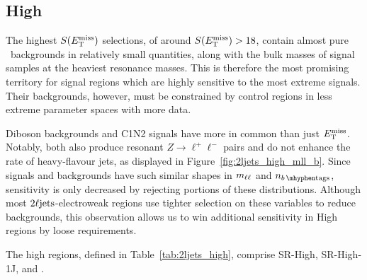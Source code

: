 \FloatBarrier
\subsection{High}
\label{sec:2ljets_high}
The highest $S(E_\mathrm{T}^\mathrm{miss})$ selections, of around $S(E_\mathrm{T}^\mathrm{miss}) > 18$, contain almost pure
\diboson\ backgrounds in relatively small quantities, along with the bulk masses
of signal samples at the heaviest resonance masses.
This is therefore the most promising territory for signal regions which are
highly sensitive to the most extreme signals.
Their backgrounds, however, must be constrained by control regions in less
extreme parameter spaces with more data.

Diboson backgrounds and C1N2 signals have more in common than just $E_\mathrm{T}^\mathrm{miss}$.
Notably, both also produce resonant $Z\rightarrow \ell^+\ell^-$ pairs
and do not enhance the rate of heavy-flavour jets, as displayed in
Figure~\ref{fig:2ljets_high_mll_b}.
Since signals and backgrounds have such similar shapes in $m_{\ell\ell}$ and $\nbtag$,
sensitivity is only decreased by rejecting portions of these distributions.
Although most $2\ell\mathrm{jets}$-electroweak regions use tighter selection on these
variables to reduce backgrounds, this observation allows us to win
additional sensitivity in High regions by loose requirements.

The high regions, defined in Table~\ref{tab:2ljets_high}, comprise SR-High,
SR-High-1J, and \srllbb.

